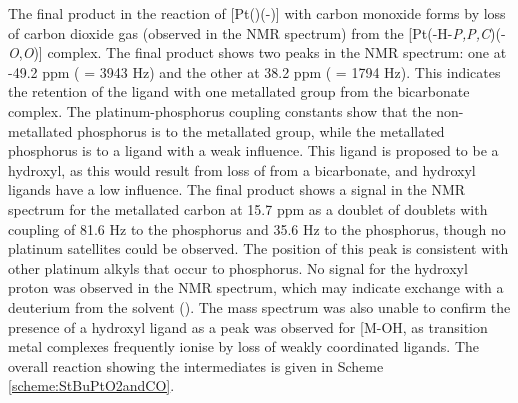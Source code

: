 The final product in the reaction of [Pt(\tButhixantphos)(-)] with carbon monoxide forms by loss of carbon dioxide gas (observed in the \carbon{} NMR spectrum) from the [Pt(\tButhixantphos-H-\dento{}\emph{P,P\textprime,C})(-\emph{O},\emph{O})] complex.  The final product shows two peaks in the \phosphorus{} NMR spectrum: one at -49.2 ppm (\JPtP{} = 3943 Hz) and the other at 38.2 ppm (\JPtP{} = 1794 Hz).  This indicates the retention of the \tButhixantphos{} ligand with one metallated \tBu{} group from the bicarbonate complex.  The platinum-phosphorus coupling constants show that the non-metallated phosphorus is \trans{} to the metallated \tBu{} group, while the metallated phosphorus is \trans{} to a ligand with a weak \trans{} influence.  This ligand is proposed to be a hydroxyl, as this would result from loss of  from a bicarbonate, and hydroxyl ligands have a low \trans{} influence.  The final product shows a signal in the \carbon{} NMR spectrum for the metallated carbon at 15.7 ppm as a doublet of doublets with coupling of 81.6 Hz to the \trans{} phosphorus and 35.6 Hz to the \cis{} phosphorus, though no platinum satellites could be observed.  The position of this peak is consistent with other platinum alkyls that occur \trans{} to phosphorus.\cite{Zayya2012, Zayya2012b, Sarahthesis}  No signal for the hydroxyl proton was observed in the \proton{} NMR spectrum, which may indicate exchange with a deuterium from the solvent ().  The mass spectrum was also unable to confirm the presence of a hydroxyl ligand as a peak was observed for [M-OH\ce{]+}, as transition metal complexes frequently ionise by loss of weakly coordinated ligands.\cite{Henderson1998}  The overall reaction showing the intermediates is given in Scheme \ref{scheme:StBuPtO2andCO}.

